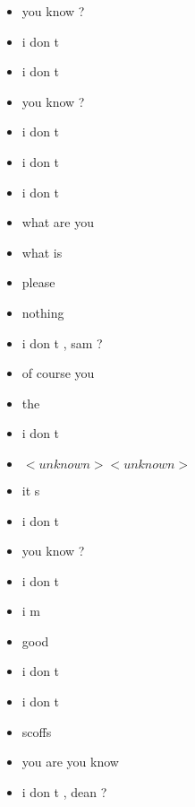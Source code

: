 \begin{multicols}{2}
\begin{itemize}
		\item you know ?
		\item i don t
		\item i don t
		\item you know ?
		\item i don t
		\item i don t
		\item i don t
		\item what are you
		\item what is
		\item please
		\item nothing
		\item i don t , sam ?
		\item of course you
		\item the
		\item i don t
		\item $<unknown> <unknown>$
		\item it s
		\item i don t
		\item you know ?
		\item i don t
		\item i m
		\item good
		\item i don t
		\item i don t
		\item scoffs
		\item you are you know
		\item i don t , dean ?
		\end{itemize}
\end{multicols}